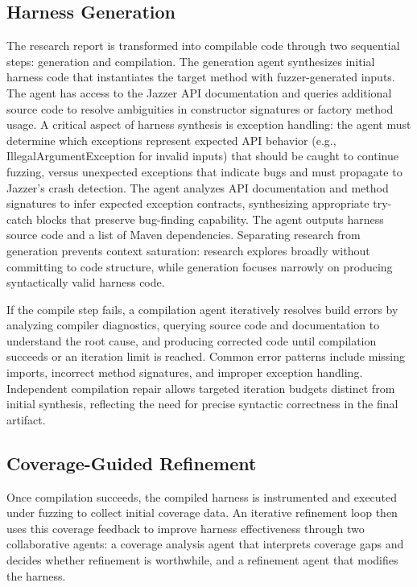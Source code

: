 \subsection{Harness Generation}%
\label{subsec:harness-generation}

The research report is transformed into compilable code through two sequential steps: generation and compilation. The generation agent synthesizes initial harness code that instantiates the target method with fuzzer-generated inputs. The agent has access to the Jazzer API documentation and queries additional source code to resolve ambiguities in constructor signatures or factory method usage. A critical aspect of harness synthesis is exception handling: the agent must determine which exceptions represent expected API behavior (e.g., IllegalArgumentException for invalid inputs) that should be caught to continue fuzzing, versus unexpected exceptions that indicate bugs and must propagate to Jazzer's crash detection. The agent analyzes API documentation and method signatures to infer expected exception contracts, synthesizing appropriate try-catch blocks that preserve bug-finding capability. The agent outputs harness source code and a list of Maven dependencies. Separating research from generation prevents context saturation: research explores broadly without committing to code structure, while generation focuses narrowly on producing syntactically valid harness code.

If the compile step fails, a compilation agent iteratively resolves build errors by analyzing compiler diagnostics, querying source code and documentation to understand the root cause, and producing corrected code until compilation succeeds or an iteration limit is reached. Common error patterns include missing imports, incorrect method signatures, and improper exception handling. Independent compilation repair allows targeted iteration budgets distinct from initial synthesis, reflecting the need for precise syntactic correctness in the final artifact.
\subsection{Coverage-Guided Refinement}%
\label{subsec:coverage-guided-refinement}

Once compilation succeeds, the compiled harness is instrumented and executed under fuzzing to collect initial coverage data. An iterative refinement loop then uses this coverage feedback to improve harness effectiveness through two collaborative agents: a coverage analysis agent that interprets coverage gaps and decides whether refinement is worthwhile, and a refinement agent that modifies the harness.

